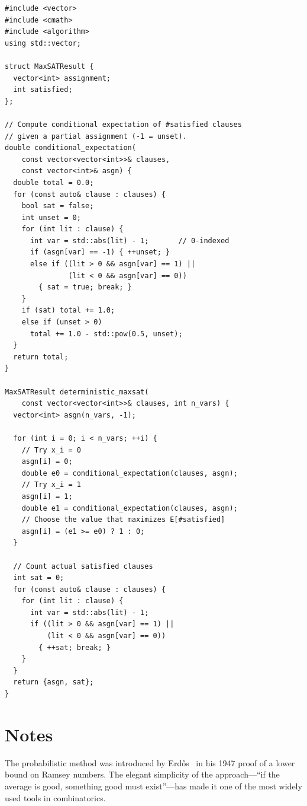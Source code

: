 \documentclass[twoside,12pt]{book}
\theoremstyle{plain}
\theoremstyle{definition}
\theoremstyle{remark}
\newenvironment{cpplisting}{\begin{center}\small}{\end{center}}
\begin{document}
\begin{cpplisting}
\begin{lstlisting}[caption={Deterministic MAX-SAT via conditional expectations (C++).}]
#include <vector>
#include <cmath>
#include <algorithm>
using std::vector;

struct MaxSATResult {
  vector<int> assignment;
  int satisfied;
};

// Compute conditional expectation of #satisfied clauses
// given a partial assignment (-1 = unset).
double conditional_expectation(
    const vector<vector<int>>& clauses,
    const vector<int>& asgn) {
  double total = 0.0;
  for (const auto& clause : clauses) {
    bool sat = false;
    int unset = 0;
    for (int lit : clause) {
      int var = std::abs(lit) - 1;       // 0-indexed
      if (asgn[var] == -1) { ++unset; }
      else if ((lit > 0 && asgn[var] == 1) ||
               (lit < 0 && asgn[var] == 0))
        { sat = true; break; }
    }
    if (sat) total += 1.0;
    else if (unset > 0)
      total += 1.0 - std::pow(0.5, unset);
  }
  return total;
}

MaxSATResult deterministic_maxsat(
    const vector<vector<int>>& clauses, int n_vars) {
  vector<int> asgn(n_vars, -1);

  for (int i = 0; i < n_vars; ++i) {
    // Try x_i = 0
    asgn[i] = 0;
    double e0 = conditional_expectation(clauses, asgn);
    // Try x_i = 1
    asgn[i] = 1;
    double e1 = conditional_expectation(clauses, asgn);
    // Choose the value that maximizes E[#satisfied]
    asgn[i] = (e1 >= e0) ? 1 : 0;
  }

  // Count actual satisfied clauses
  int sat = 0;
  for (const auto& clause : clauses) {
    for (int lit : clause) {
      int var = std::abs(lit) - 1;
      if ((lit > 0 && asgn[var] == 1) ||
          (lit < 0 && asgn[var] == 0))
        { ++sat; break; }
    }
  }
  return {asgn, sat};
}
\end{lstlisting}
\end{cpplisting}

\section*{Notes}

The probabilistic method was introduced by Erd\H{o}s~\cite{erdos1947} in
his 1947 proof of a lower bound on Ramsey numbers. The elegant simplicity
of the approach---``if the average is good, something good must
exist''---has made it one of the most widely used tools in combinatorics.
\end{document}
